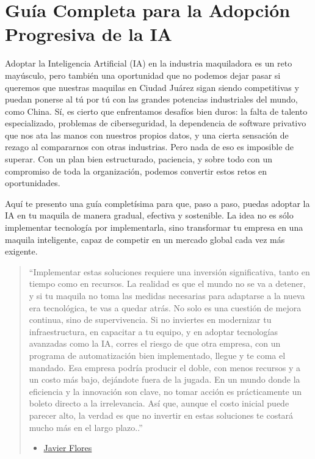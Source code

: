 \documentclass[
  10pt,
  letterpaper,
]{book}
\providecommand{\tightlist}{%
  \setlength{\itemsep}{0pt}\setlength{\parskip}{0pt}}\usepackage{longtable,booktabs,array}
\begin{document}
\section{Guía Completa para la Adopción Progresiva de la
IA}\label{guuxeda-completa-para-la-adopciuxf3n-progresiva-de-la-ia}

Adoptar la Inteligencia Artificial (IA) en la industria maquiladora es
un reto mayúsculo, pero también una oportunidad que no podemos dejar
pasar si queremos que nuestras maquilas en Ciudad Juárez sigan siendo
competitivas y puedan ponerse al tú por tú con las grandes potencias
industriales del mundo, como China. Sí, es cierto que enfrentamos
desafíos bien duros: la falta de talento especializado, problemas de
ciberseguridad, la dependencia de software privativo que nos ata las
manos con nuestros propios datos, y una cierta sensación de rezago al
compararnos con otras industrias. Pero nada de eso es imposible de
superar. Con un plan bien estructurado, paciencia, y sobre todo con un
compromiso de toda la organización, podemos convertir estos retos en
oportunidades.

Aquí te presento una guía completísima para que, paso a paso, puedas
adoptar la IA en tu maquila de manera gradual, efectiva y sostenible. La
idea no es sólo implementar tecnología por implementarla, sino
transformar tu empresa en una maquila inteligente, capaz de competir en
un mercado global cada vez más exigente.

\begin{quote}
``Implementar estas soluciones requiere una inversión significativa,
tanto en tiempo como en recursos. La realidad es que el mundo no se va a
detener, y si tu maquila no toma las medidas necesarias para adaptarse a
la nueva era tecnológica, te vas a quedar atrás. No solo es una cuestión
de mejora continua, sino de supervivencia. Si no inviertes en modernizar
tu infraestructura, en capacitar a tu equipo, y en adoptar tecnologías
avanzadas como la IA, corres el riesgo de que otra empresa, con un
programa de automatización bien implementado, llegue y te coma el
mandado. Esa empresa podría producir el doble, con menos recursos y a un
costo más bajo, dejándote fuera de la jugada. En un mundo donde la
eficiencia y la innovación son clave, no tomar acción es prácticamente
un boleto directo a la irrelevancia. Así que, aunque el costo inicial
puede parecer alto, la verdad es que no invertir en estas soluciones te
costará mucho más en el largo plazo..''

\begin{itemize}
\tightlist
\item
  \href{https://twitter.com/xavierflorex2}{Javier Flores}
\end{itemize}
\end{quote}
\end{document}
